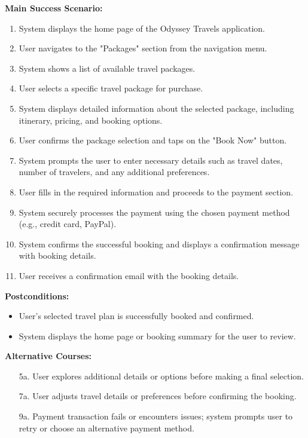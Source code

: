 \documentclass{scrreprt}
\begin{document}
\textbf{Main Success Scenario:}
\begin{enumerate}
    \item System displays the home page of the Odyssey Travels application.
    \item User navigates to the "Packages" section from the navigation menu.
    \item System shows a list of available travel packages.
    \item User selects a specific travel package for purchase.
    \item System displays detailed information about the selected package, including itinerary, pricing, and booking options.
    \item User confirms the package selection and taps on the "Book Now" button.
    \item System prompts the user to enter necessary details such as travel dates, number of travelers, and any additional preferences.
    \item User fills in the required information and proceeds to the payment section.
    \item System securely processes the payment using the chosen payment method (e.g., credit card, PayPal).
    \item System confirms the successful booking and displays a confirmation message with booking details.
    \item User receives a confirmation email with the booking details.
\end{enumerate}

\textbf{Postconditions:}
\begin{itemize}
    \item User's selected travel plan is successfully booked and confirmed.
    \item System displays the home page or booking summary for the user to review.
\end{itemize}

\textbf{Alternative Courses:}
\begin{itemize}
    \item[5a.] User explores additional details or options before making a final selection.
    \item[7a.] User adjusts travel details or preferences before confirming the booking.
    \item[9a.] Payment transaction fails or encounters issues; system prompts user to retry or choose an alternative payment method.
\end{itemize}
\end{document}

